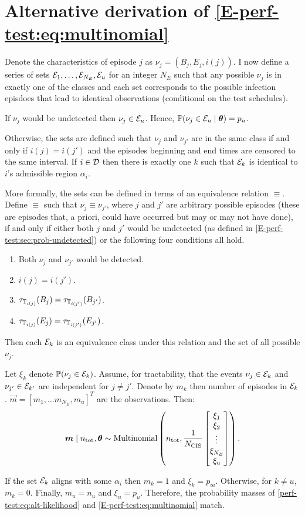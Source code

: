 \documentclass[thesis.tex]{subfiles}
\begin{document}
\chapter{Alternative derivation of \cref{E-perf-test:eq:multinomial}} \label{perf-test:sec:alt-likelihood}

Denote the characteristics of episode $j$ as $\nu_j = (B_j, E_j, i(j))$.
I now define a series of sets $\mathcal{E}_1, \dots, \mathcal{E}_{N_E}, \mathcal{E}_u$ for an integer $N_E$ such that any possible $\nu_j$ is in exactly one of the classes and each set corresponds to the possible infection episdoes that lead to identical observations (conditional on the test schedules).

If $\nu_j$ would be undetected then $\nu_j \in \mathcal{E}_u$.
Hence, $\operatorname{\mathbb{P}}(\nu_j \in \mathcal{E}_u \mid \bm{\theta}) = p_u$.

Otherwise, the sets are defined such that $\nu_j$ and $\nu_{j'}$ are in the same class if and only if $i(j) = i(j')$ and the episodes beginning and end times are censored to the same interval.
If $i \in \mathcal{D}$ then there is exactly one $k$ such that $\mathcal{E}_k$ is identical to $i$'s admissible region $\alpha_i$.

More formally, the sets can be defined in terms of an equivalence relation $\equiv$.
Define $\equiv$ such that $\nu_j \equiv \nu_{j'}$, where $j$ and $j'$ are arbitrary possible episodes (\ie these are episodes that, a priori, could have occurred but may or may not have done), if and only if either both $j$ and $j'$ would be undetected (as defined in \cref{E-perf-test:sec:prob-undetected}) or the following four conditions all hold.
\begin{enumerate}
    \item Both $\nu_j$ and $\nu_{j'}$ would be detected.
    \item $i(j) = i(j')$.
    \item $\tau_{\mathbb{T}_{i(j)}}(B_j) = \tau_{\mathbb{T}_{i(j')}}(B_{j'})$.
    \item $\tau_{\mathbb{T}_{i(j)}}(E_j) = \tau_{\mathbb{T}_{i(j')}}(E_{j'})$.
\end{enumerate}
Then each $\mathcal{E}_k$ is an equivalence class under this relation and the set of all possible $\nu_j$.

Let $\xi_k$ denote $\operatorname{\mathbb{P}}(\nu_j \in \mathcal{E}_k)$.
Assume, for tractability, that the events $\nu_j \in \mathcal{E}_k$ and $\nu_{j'} \in \mathcal{E}_{k'}$ are independent for $j \neq j'$.
Denote by $m_k$ then number of episodes in $\mathcal{E}_k$.
$\vec{m} = [m_1, \dots m_{N_E}, m_u]^T$ are the observations.
Then:
\begin{align}
  \bm{m}
  \mid n_\text{tot}, \bm{\theta}
  \sim
  \operatorname{Multinomial}\left(
    n_\text{tot},
    \frac{1}{N_\text{CIS}}
    \begin{bmatrix}
        \xi_1 \\ \xi_2 \\ \vdots \\ \xi_{N_E} \\ \xi_u
    \end{bmatrix}
  \right).
  \label{perf-test:eq:alt-likelihood}
\end{align}

If the set $\mathcal{E}_k$ aligns with some $\alpha_i$ then $m_k = 1$ and $\xi_k = p_{ia}$.
Otherwise, for $k \neq u$, $m_k = 0$.
Finally, $m_u = n_u$ and $\xi_u = p_u$.
Therefore, the probability masses of \cref{perf-test:eq:alt-likelihood} and \cref{E-perf-test:eq:multinomial} match.
\end{document}
